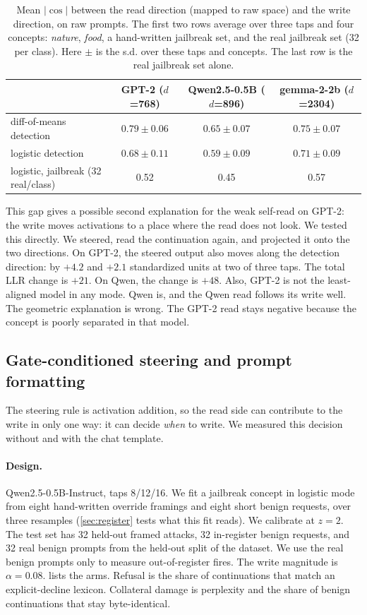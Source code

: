 \documentclass[11pt]{article}
\begin{document}
\begin{table}[t]
\centering
\small
\caption{Mean $|\cos|$ between the read direction (mapped to raw space) and the write direction, on raw
prompts. The first two rows average over three taps and four concepts: \emph{nature}, \emph{food}, a
hand-written jailbreak set, and the real jailbreak set (32 per class). Here $\pm$ is the s.d. over these
taps and concepts. The last row is the real jailbreak set alone.}
\label{tab:cosine}
\begin{tabular}{lccc}
\toprule
 & GPT-2 ($d$=768) & Qwen2.5-0.5B ($d$=896) & gemma-2-2b ($d$=2304) \\
\midrule
diff-of-means detection & $0.79\pm0.06$ & $0.65\pm0.07$ & $0.75\pm0.07$ \\
logistic detection & $0.68\pm0.11$ & $0.59\pm0.09$ & $0.71\pm0.09$ \\
logistic, jailbreak (32 real/class) & 0.52 & 0.45 & 0.57 \\
\bottomrule
\end{tabular}
\end{table}

This gap gives a possible second explanation for the weak self-read on GPT-2: the write moves activations
to a place where the read does not look. We tested this directly. We steered, read the continuation again,
and projected it onto the two directions. On GPT-2, the steered output also moves along the detection
direction: by $+4.2$ and $+2.1$ standardized units at two of three taps. The total LLR change is $+21$. On
Qwen, the change is $+48$. Also, GPT-2 is not the least-aligned model in any mode. Qwen is, and the Qwen
read follows its write well. The geometric explanation is wrong. The GPT-2 read stays negative because
the concept is poorly separated in that model.

\subsection{Gate-conditioned steering and prompt formatting}
\label{sec:formatting}
The steering rule is activation addition, so the read side can contribute to the write in only one way:
it can decide \emph{when} to write. We measured this decision without and with the chat template.

\paragraph{Design.} Qwen2.5-0.5B-Instruct, taps 8/12/16. We fit a jailbreak concept in logistic mode from
eight hand-written override framings and eight short benign requests, over three resamples
(\cref{sec:register} tests what this fit reads). We calibrate
at $z=2$. The test set has 32 held-out framed attacks, 32 in-register benign requests, and 32 real benign
prompts from the held-out split of the dataset. We use the real benign prompts only to measure
out-of-register fires. The write magnitude is $\alpha=0.08$.  lists the arms. Refusal is the
share of continuations that match an explicit-decline lexicon. Collateral damage is perplexity and the
share of benign continuations that stay byte-identical.
\end{document}
